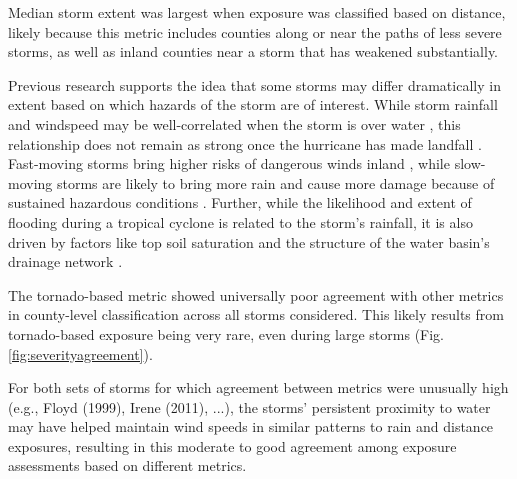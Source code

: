 \documentclass[fleqn,10pt,lineno]{olplainarticle}
\begin{document}
Median storm extent was largest when exposure was classified based on distance,
likely because this metric includes counties along or near the paths of less
severe storms, as well as inland counties near a storm that has weakened
substantially.

Previous research supports the idea that some storms may differ dramatically in
extent based on which hazards of the storm are of interest. While storm rainfall
and windspeed may be well-correlated when the storm is over water
\citep{cerveny2000}, this relationship does not remain as strong once the
hurricane has made landfall \citep{jiang2008}. Fast-moving storms bring higher
risks of dangerous winds inland \citep{kruk2010}, while slow-moving storms are
likely to bring more rain \citep{rappaport2000} and cause more damage because of
sustained hazardous conditions \citep{rezapour2014}. Further, while the
likelihood and extent of flooding during a tropical cyclone is related to the
storm's rainfall, it is also driven by factors like top soil saturation and the
structure of the water basin's drainage network \citep{chen2015, rees2001}.

The tornado-based metric showed universally poor agreement
with other metrics in county-level classification across all storms considered.
This likely results from tornado-based exposure being very rare, even during
large storms (Fig. \ref{fig:severityagreement}).

For both sets of storms for which agreement between metrics were unusually high
(e.g., Floyd (1999), Irene (2011), ...), the storms' persistent proximity to
water may have helped maintain wind speeds in similar patterns to rain and
distance exposures, resulting in this moderate to good agreement among exposure
assessments based on different metrics. 
\end{document}
